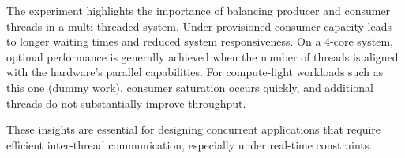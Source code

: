 \documentclass[11pt]{article}
\begin{document}
The experiment highlights the importance of balancing producer and consumer threads in a multi-threaded system. Under-provisioned consumer capacity leads to longer waiting times and reduced system responsiveness. On a 4-core system, optimal performance is generally achieved when the number of threads is aligned with the hardware's parallel capabilities. For compute-light workloads such as this one (dummy work), consumer saturation occurs quickly, and additional threads do not substantially improve throughput.

These insights are essential for designing concurrent applications that require efficient inter-thread communication, especially under real-time constraints.
\end{document}
